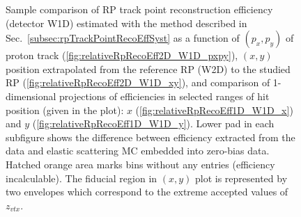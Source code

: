 \begin{figure}[h]
{\begin{subfigure}[b]{\linewidth}
		\end{subfigure}
	}
	\caption[Coparison of estimated RP track point reconstruction efficiency in 2D and 1D (detector W1D).]%
	{Sample comparison of RP track point reconstruction efficiency (detector W1D) estimated with the method described in Sec.~\ref{subsec:rpTrackPointRecoEffSyst} as a function of $(p_{x},p_{y})$ of proton track (\ref{fig:relativeRpRecoEff2D_W1D_pxpy}), $(x,y)$ position extrapolated from the reference RP (W2D) to the studied RP (\ref{fig:relativeRpRecoEff2D_W1D_xy}), and comparison of 1-dimensional projections of efficiencies in selected ranges of hit position (given in the plot): $x$ (\ref{fig:relativeRpRecoEff1D_W1D_x}) and $y$ (\ref{fig:relativeRpRecoEff1D_W1D_y}). Lower pad in each subfigure shows the difference between efficiency extracted from the data and elastic scattering MC embedded into zero-bias data. Hatched orange area marks bins without any entries (efficiency incalculable). The fiducial region in $(x,y)$ plot is represented by two envelopes which correspond to the extreme accepted values of $z_{vtx}$.%
	}\label{fig:relativeRpRecoEff_W1D}
\end{figure}








